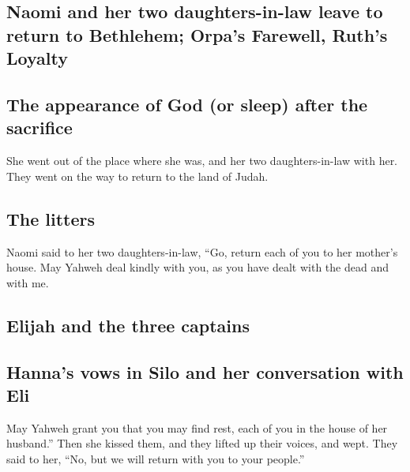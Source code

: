 \begin{paracol}{2}
\begin{otherlanguage}{english}
\hypertarget{naomi-and-her-two-daughters-in-law-leave-to-return-to-bethlehem-orpas-farewell-ruths-loyalty}{%
\subsection{Naomi and her two daughters-in-law leave to return to
Bethlehem; Orpa's Farewell, Ruth's
Loyalty}\label{naomi-and-her-two-daughters-in-law-leave-to-return-to-bethlehem-orpas-farewell-ruths-loyalty}}

\hypertarget{the-appearance-of-god-or-sleep-after-the-sacrifice}{%
\subsection{The appearance of God (or sleep) after the
sacrifice}\label{the-appearance-of-god-or-sleep-after-the-sacrifice}}

 She went out of the place where she was, and her two
daughters-in-law with her. They went on the way to return to the land of
Judah.

\hypertarget{the-litters}{%
\subsection{The litters}\label{the-litters}}

 Naomi said to her two daughters-in-law, ``Go, return each
of you to her mother's house. May Yahweh deal kindly with you, as you
have dealt with the dead and with me.

\hypertarget{elijah-and-the-three-captains}{%
\subsection{Elijah and the three
captains}\label{elijah-and-the-three-captains}}

\hypertarget{hannas-vows-in-silo-and-her-conversation-with-eli}{%
\subsection{Hanna's vows in Silo and her conversation with
Eli}\label{hannas-vows-in-silo-and-her-conversation-with-eli}}

 May Yahweh grant you that you may find rest, each of you
in the house of her husband.'' Then she kissed them, and they lifted up
their voices, and wept.  They said to her, ``No, but we
will return with you to your people.''


\end{otherlanguage}
\end{paracol}
